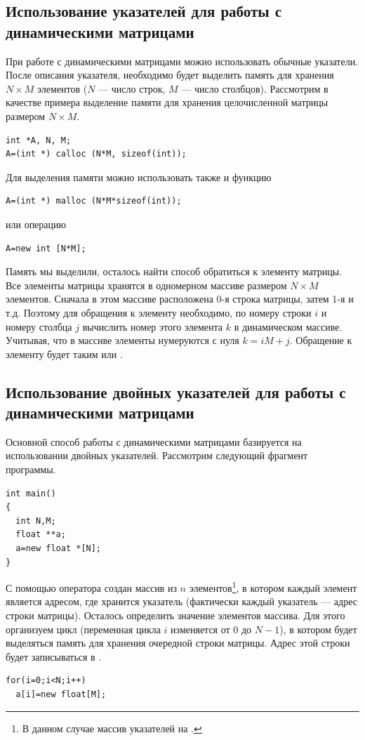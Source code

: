 \subsection[Использование указателей для работы с динамическими матрицами]{Использование указателей для работы с
динамическими матрицами}
При работе с динамическими матрицами можно использовать обычные указатели. После описания указателя, необходимо будет
выделить память для хранения $N\times M$ элементов ($N$ --- число строк, $M$ --- число столбцов). Рассмотрим
в качестве примера выделение памяти для хранения целочисленной матрицы размером $N\times M$.
\begin{lstlisting}
int *A, N, M;
A=(int *) calloc (N*M, sizeof(int));
\end{lstlisting}
Для выделения памяти можно использовать также и функцию  
\begin{lstlisting}
A=(int *) malloc (N*M*sizeof(int));
\end{lstlisting}
или операцию 
\begin{lstlisting}
A=new int [N*M];
\end{lstlisting}

Память мы выделили, осталось найти способ обратиться к элементу матрицы. Все элементы матрицы хранятся в одномерном
массиве размером $N\times M$ элементов. Сначала в этом массиве расположена 0-я строка матрицы, затем 1-я и т.д.
Поэтому для обращения к элементу  необходимо, по номеру строки $i$ и номеру столбца $j$ вычислить номер этого
элемента $k$ в динамическом массиве. Учитывая, что в массиве элементы нумеруются с нуля
$k=iM+j$. Обращение к элементу 
будет таким  или .

\subsection[Использование двойных указателей для работы с динамическими матрицами]{Использование двойных указателей
для работы с динамическими матрицами}
Основной способ работы с динамическими матрицами базируется на использовании двойных указателей. Рассмотрим следующий
фрагмент программы.
\begin{lstlisting}
int main()
{
  int N,M; 
  float **a;
  a=new float *[N];
}
\end{lstlisting}

С помощью оператора  создан массив из $n$ элементов\footnote{В данном случае массив указателей 
на .}, в котором
каждый элемент является адресом, где хранится указатель (фактически каждый указатель --- адрес строки матрицы). Осталось
определить значение элементов массива. Для этого организуем цикл (переменная цикла $i$ изменяется от 0 до
$N-1$), в котором будет выделяться память для хранения очередной строки матрицы. Адрес этой строки будет
записываться в .
\begin{lstlisting}
for(i=0;i<N;i++)
  a[i]=new float[M];
\end{lstlisting}

